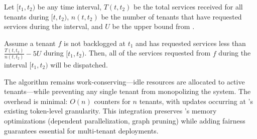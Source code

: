\begin{theorem}
    Let $[t_1, t_2)$ be any time interval, $T(t,t_2)$ be the total services received for all tenants during $[t,t_2)$, $n(t,t_2)$ be the number of tenants that have requested services during the interval, and $U$ be the upper bound from .

    Assume a tenant $f$ is not backlogged at $t_1$ and has requested services less than $\frac{T(t,t_2)}{n(t,t_2)}-5U$ during $[t_1, t_2)$. Then, all of the services requested from $f$ during the interval $[t_1,t_2)$ will be dispatched.
\end{theorem}

The algorithm remains work-conserving---idle resources are allocated to active tenants---while preventing any single tenant from monopolizing the system. The overhead is minimal: $O(n)$ counters for $n$ tenants, with updates occurring at \FlexLLM's existing token-level granularity. This integration preserves \FlexLLM's memory optimizations (dependent parallelization, graph pruning) while adding fairness guarantees essential for multi-tenant deployments.

